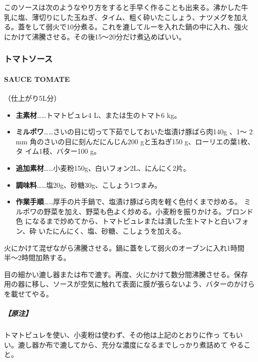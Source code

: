 このソースは次のようなやり方をすると手早く作ることも出来る。沸かした牛
乳に塩、薄切りにした玉ねぎ、タイム、粗く砕いたこしょう、ナツメグを加え
る。蓋をして弱火で10分煮る。これを漉してルーを入れた鍋の中に入れ、強火
にかけて沸騰させる。その後15〜20分だけ煮込めばいい。

\maeaki

\hypertarget{ux30c8ux30deux30c8ux30bdux30fcux30b9}{%
\subsubsection{トマトソース}\label{ux30c8ux30deux30c8ux30bdux30fcux30b9}}

\hypertarget{sauce-tomate}{%
\paragraph{SAUCE TOMATE}\label{sauce-tomate}}


（仕上がり5L分）

\begin{itemize}
\item
  \textbf{主素材}\ldots{}\ldots{}トマトピュレ4 L、または生のトマト6 kg。
\item
  \textbf{ミルポワ}\ldots{}\ldots{}さいの目に切って下茹でしておいた塩漬け豚ばら肉140g
  、1〜 2 mm 角のさいの目に刻んだにんじん200 gと玉ねぎ150
  g、ローリエの葉1枚、タ イム1枝、バター100 g。
\item
  \textbf{追加素材}\ldots{}\ldots{}小麦粉150g、白いフォン2L、にんにく2片。
\item
  \textbf{調味料}\ldots{}\ldots{}塩20g、砂糖30g、こしょう1つまみ。
\item
  \textbf{作業手順}\ldots{}\ldots{}厚手の片手鍋で、塩漬け豚ばら肉を軽く色付くまで炒める。
  ミルポワの野菜を加え、野菜も色よく炒める。小麦粉を振りかける。ブロンド色
  になるまで炒めてから、トマトピュレまたは潰した生トマトと白いフォン、砕
  いたにんにく、塩、砂糖、こしょうを加える。
\end{itemize}

火にかけて混ぜながら沸騰させる。鍋に蓋をして弱火のオーブンに入れ1時間
半〜2時間加熱する。

目の細かい漉し器または布で漉す。再度、火にかけて数分間沸騰させる。保存
用の器に移し、ソースが空気に触れて表面に膜が張らないよう、バターのかけら
を載せてやる。

\hypertarget{ux539fux6ce8-4}{%
\subparagraph{【原注】}\label{ux539fux6ce8-4}}

トマトピュレを使い、小麦粉は使わず、その他は上記のとおりに作っ
てもいい。漉し器か布で漉してから、充分な濃度になるまでしっかり煮詰めて
やること。
